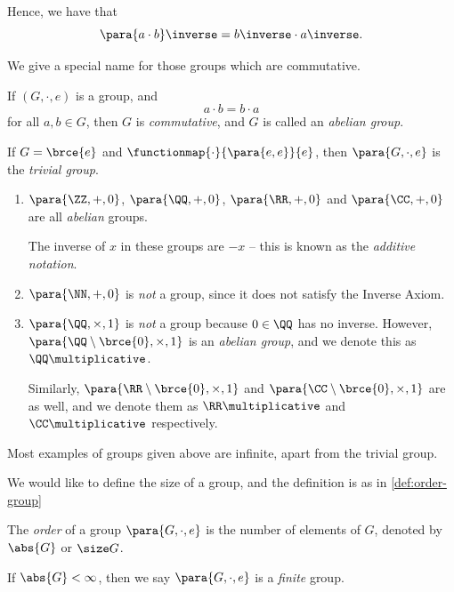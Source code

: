 Hence, we have that
\[
    \para{a \cdot b}\inverse = b \inverse \cdot a \inverse.
\]

We give a special name for those groups which are commutative.

\begin{definition}
    \label{def:abelian-group}%
    If \((G, \cdot, e)\) is a group, and
    \[
        a \cdot b = b \cdot a
    \]
    for all \(a, b \in G\), then \(G\) is \emph{commutative}, and \(G\) is called an \emph{abelian group}.
\end{definition}

\begin{example}
    If \(G = \brce{e}\) and \(\functionmap{\cdot}{\para{e, e}}{e}\), then \(\para{G, \cdot, e}\) is the \emph{trivial group}.
\end{example}

\begin{examples}
    \begin{enumerate}
        \item \(\para{\ZZ, +, 0}\), \(\para{\QQ, +, 0}\), \(\para{\RR, +, 0}\) and \(\para{\CC, +, 0}\) are all \emph{abelian} groups.
        
        The inverse of \(x\) in these groups are \(-x\) -- this is known as the \emph{additive notation}.

        \item \(\para{\NN, +, 0}\) is \emph{not} a group, since it does not satisfy the Inverse Axiom.
        
        \item \(\para{\QQ, \times, 1}\) is \emph{not} a group because \(0 \in \QQ\) has no inverse. However, \(\para{\QQ \setminus \brce{0}, \times, 1}\) is an \emph{abelian group}, and we denote this as \(\QQ\multiplicative\).
        
        Similarly, \(\para{\RR \setminus \brce{0}, \times, 1}\) and \(\para{\CC \setminus \brce{0}, \times, 1}\) are as well, and we denote them as \(\RR\multiplicative\) and \(\CC\multiplicative\) respectively.
    \end{enumerate}
\end{examples}

Most examples of groups given above are infinite, apart from the trivial group.

We would like to define the size of a group, and the definition is as in  \autoref{def:order-group}

\begin{definition}
    \label{def:order-group}%
    The \emph{order} of a group \(\para{G, \cdot, e}\) is the number of elements of \(G\), denoted by \(\abs{G}\) or \(\size G\).

    If \(\abs{G} < \infty\), then we say \(\para{G, \cdot, e}\) is a \emph{finite} group.
\end{definition}

